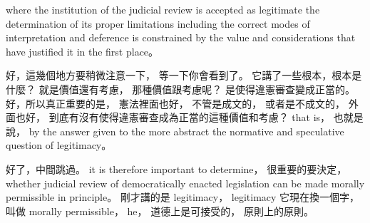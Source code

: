 \hypertarget{w02:cue:740}{}where the institution of the judicial review is accepted as legitimate
\hypertarget{w02:cue:741}{}the determination of its proper limitations
\hypertarget{w02:cue:742}{}including the correct modes of interpretation and deference
\hypertarget{w02:cue:743}{}is constrained by the value and considerations that have justified it in the first place。

\hypertarget{w02:cue:744}{}好，這幾個地方要稍微注意一下，
\hypertarget{w02:cue:745}{}等一下你會看到了。
\hypertarget{w02:cue:746}{}它講了一些根本，根本是什麼？
\hypertarget{w02:cue:747}{}就是價值還有考慮，
\hypertarget{w02:cue:748}{}那種價值跟考慮呢？
\hypertarget{w02:cue:749}{}是使得違憲審查變成正當的。
\hypertarget{w02:cue:750}{}好，所以真正重要的是，
\hypertarget{w02:cue:751}{}憲法裡面也好，
\hypertarget{w02:cue:752}{}不管是成文的，
\hypertarget{w02:cue:753}{}或者是不成文的，
\hypertarget{w02:cue:754}{}外面也好，
\hypertarget{w02:cue:755}{}到底有沒有使得違憲審查成為正當的這種價值和考慮？
\hypertarget{w02:cue:756}{}that is，
\hypertarget{w02:cue:757}{}也就是說，
\hypertarget{w02:cue:758}{}by the answer given to the more abstract
\hypertarget{w02:cue:759}{}the normative and speculative question of legitimacy。

\hypertarget{w02:cue:760}{}好了，中間跳過。
\hypertarget{w02:cue:761}{}it is therefore important to determine，
\hypertarget{w02:cue:762}{}很重要的要決定，
\hypertarget{w02:cue:763}{}whether judicial review of democratically enacted legislation can be made morally permissible in principle。
\hypertarget{w02:cue:764}{}剛才講的是 legitimacy，
\hypertarget{w02:cue:765}{}legitimacy 它現在換一個字，
\hypertarget{w02:cue:766}{}叫做 morally permissible，
\hypertarget{w02:cue:767}{}he，
\hypertarget{w02:cue:768}{}道德上是可接受的，
\hypertarget{w02:cue:769}{}原則上的原則。

